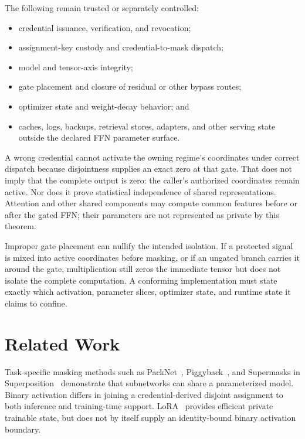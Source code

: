 \documentclass[11pt]{article}
\begin{document}
The following remain trusted or separately controlled:
\begin{itemize}
  \item credential issuance, verification, and revocation;
  \item assignment-key custody and credential-to-mask dispatch;
  \item model and tensor-axis integrity;
  \item gate placement and closure of residual or other bypass routes;
  \item optimizer state and weight-decay behavior; and
  \item caches, logs, backups, retrieval stores, adapters, and other serving
  state outside the declared FFN parameter surface.
\end{itemize}

A wrong credential cannot activate the owning regime's coordinates under
correct dispatch because disjointness supplies an exact zero at that gate. That
does not imply that the complete output is zero: the caller's authorized
coordinates remain active. Nor does it prove statistical independence of shared
representations. Attention and other shared components may compute common
features before or after the gated FFN; their parameters are not represented as
private by this theorem.

Improper gate placement can nullify the intended isolation. If a protected
signal is mixed into active coordinates before masking, or if an ungated branch
carries it around the gate, multiplication still zeros the immediate tensor but
does not isolate the complete computation. A conforming implementation must
state exactly which activation, parameter slices, optimizer state, and runtime
state it claims to confine.

\section{Related Work}

Task-specific masking methods such as PackNet~\citep{mallya2018packnet},
Piggyback~\citep{mallya2018piggyback}, and Supermasks in
Superposition~\citep{wortsman2020supermasks} demonstrate that subnetworks can
share a parameterized model. Binary activation differs in joining a
credential-derived disjoint assignment to both inference and training-time
support. LoRA~\citep{hu2022lora} provides efficient private trainable state, but
does not by itself supply an identity-bound binary activation boundary.
\end{document}

